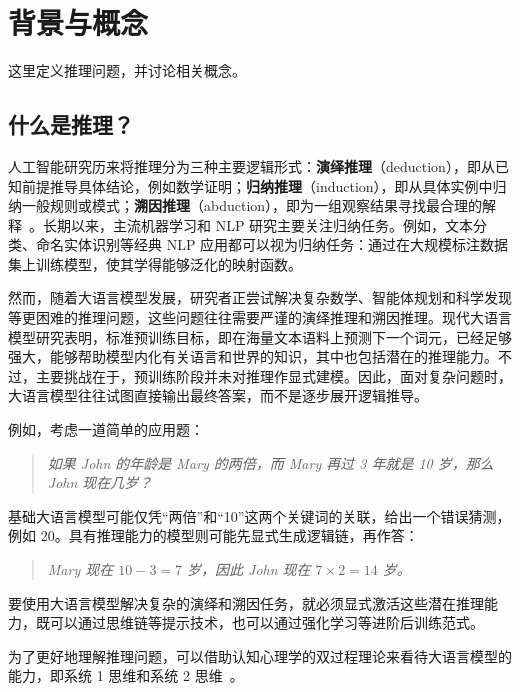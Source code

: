 
\section{背景与概念}

这里定义推理问题，并讨论相关概念。

\subsection{什么是推理？}

人工智能研究历来将推理分为三种主要逻辑形式：\textbf{演绎推理}（deduction），即从已知前提推导具体结论，例如数学证明；\textbf{归纳推理}（induction），即从具体实例中归纳一般规则或模式；\textbf{溯因推理}（abduction），即为一组观察结果寻找最合理的解释~\cite{peirce1931:collected}。长期以来，主流机器学习和 NLP 研究主要关注归纳任务。例如，文本分类、命名实体识别等经典 NLP 应用都可以视为归纳任务：通过在大规模标注数据集上训练模型，使其学得能够泛化的映射函数。

然而，随着大语言模型发展，研究者正尝试解决复杂数学、智能体规划和科学发现等更困难的推理问题，这些问题往往需要严谨的演绎推理和溯因推理。现代大语言模型研究表明，标准预训练目标，即在海量文本语料上预测下一个词元，已经足够强大，能够帮助模型内化有关语言和世界的知识，其中也包括潜在的推理能力。不过，主要挑战在于，预训练阶段并未对推理作显式建模。因此，面对复杂问题时，大语言模型往往试图直接输出最终答案，而不是逐步展开逻辑推导。

例如，考虑一道简单的应用题：

\begin{quote}
\textit{如果 John 的年龄是 Mary 的两倍，而 Mary 再过 3 年就是 10 岁，那么 John 现在几岁？}
\end{quote}

基础大语言模型可能仅凭“两倍”和“10”这两个关键词的关联，给出一个错误猜测，例如 20。具有推理能力的模型则可能先显式生成逻辑链，再作答：

\begin{quote}
\textit{Mary 现在 $10 - 3 = 7$ 岁，因此 John 现在 $7 \times 2 = 14$ 岁。}
\end{quote}

要使用大语言模型解决复杂的演绎和溯因任务，就必须显式激活这些潜在推理能力，既可以通过思维链等提示技术，也可以通过强化学习等进阶后训练范式。

为了更好地理解推理问题，可以借助认知心理学的双过程理论来看待大语言模型的能力，即系统 1 思维和系统 2 思维~\cite{kahneman:2011thinking}。

